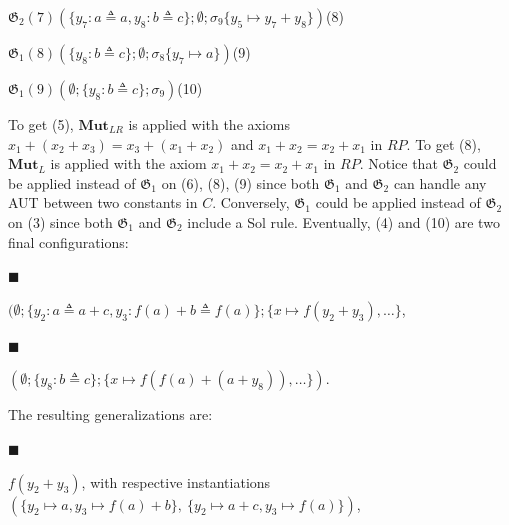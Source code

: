 \documentclass[10pt,a4paper]{amsart}
\begin{document}
\par  $\mathfrak{G}_{2}(7)$\quad  $(\{y_{7}:a\triangleq a,y_{8}:b\triangleq c\};\emptyset;\sigma_{9}\{y_{5}\mapsto y_{7}+y_{8}\})$\quad  (8)\quad  
 
\par  $\mathfrak{G}_{1}(8)$\quad  $(\{y_{8}:b\triangleq c\};\emptyset;\sigma_{8}\{y_{7}\mapsto a\})$\quad  (9)\quad  
 
\par  $\mathfrak{G}_{1}(9)$\quad  $(\emptyset;\{y_{8}:b\triangleq c\};\sigma_{9})$\quad  (10)\quad  
   
 
 
To get (5), $\textbf{Mut}_{LR}$ is applied with the axioms $x_{1}+(x_{2}+x_{3})=x_{3}+(x_{1}+x_{2})$ and $x_{1}+x_{2}=x_{2}+x_{1}$ in $RP$. To get (8), $\textbf{Mut}_{L}$ is applied with the axiom $x_{1}+x_{2}=x_{2}+x_{1}$ in $RP$. Notice that $\mathfrak{G}_{2}$ could be applied instead of $\mathfrak{G}_{1}$ on (6), (8), (9) since both $\mathfrak{G}_{1}$ and $\mathfrak{G}_{2}$ can handle any AUT between two constants in $C$. Conversely, $\mathfrak{G}_{1}$ could be applied instead of $\mathfrak{G}_{2}$ on (3) since both $\mathfrak{G}_{1}$ and $\mathfrak{G}_{2}$ include a Sol rule. Eventually, (4) and (10) are two final configurations:\par
  
\par\noindent  $\blacksquare$ 
 
$(\emptyset;\{y_{2}:a\triangleq a+c,y_{3}:f(a)+b\triangleq f(a)\};\{x\mapsto f(y_{2}+y_{3}),\dots\}$,\par
 
 
 
\par\noindent  $\blacksquare$ 
 
$(\emptyset;\{y_{8}:b\triangleq c\};\{x\mapsto f(f(a)+(a+y_{8})),\dots\})$.\par
 
 
  
The resulting generalizations are:\par
  
\par\noindent  $\blacksquare$ 
 
$f(y_{2}+y_{3})$, with respective instantiations $(\{y_{2}\mapsto a,y_{3}\mapsto f(a)+b\},\ \{y_{2}\mapsto a+c,\allowbreak y_{3}\mapsto f(a)\})$,\par
 
\end{document}
